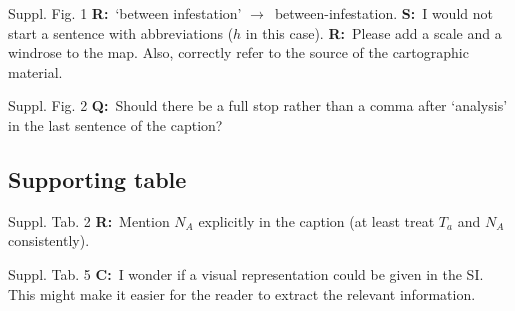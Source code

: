 \documentclass[11pt]{article}
\newenvironment{my_description}
{\begin{description}
  \setlength{\itemsep}{2pt}
  \setlength{\parskip}{0pt}
  \setlength{\parsep}{0pt}}
{\end{description}}
\newcommand{\ra}{$\rightarrow$\ }
\newcommand{\C}{\textbf{C:}\ }
\newcommand{\Q}{\textbf{Q:}\ }
\newcommand{\R}{\textbf{R:}\ }
\newcommand{\V}{\textbf{S:}\ }
\begin{document}
\begin{my_description}
	\item[Suppl. Fig. 1] \R `between infestation' \ra between-infestation. \V I would not start a sentence with abbreviations ($h$ in this case). \R Please add a scale and a windrose to the map. Also, correctly refer to the source of the cartographic material.
	\item[Suppl. Fig. 2] \Q Should there be a full stop rather than a comma after `analysis' in the last sentence of the caption?
\end{my_description}

\subsection{Supporting table}

\begin{my_description}
	\item[Suppl. Tab. 2]  \R Mention $N_A$ explicitly in the caption (at least treat $T_a$ and $N_A$ consistently).
	\item[Suppl. Tab. 5]  \C I wonder if a visual representation could be given in the SI. This might make it easier for the reader to extract the relevant information.
\end{my_description}





\end{document}

